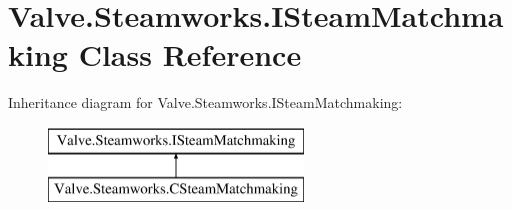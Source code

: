 \hypertarget{classValve_1_1Steamworks_1_1ISteamMatchmaking}{}\section{Valve.\+Steamworks.\+I\+Steam\+Matchmaking Class Reference}
\label{classValve_1_1Steamworks_1_1ISteamMatchmaking}
Inheritance diagram for Valve.\+Steamworks.\+I\+Steam\+Matchmaking\+:\begin{figure}[H]
\begin{center}
\leavevmode
\includegraphics[height=2.000000cm]{classValve_1_1Steamworks_1_1ISteamMatchmaking}
\end{center}
\end{figure}
